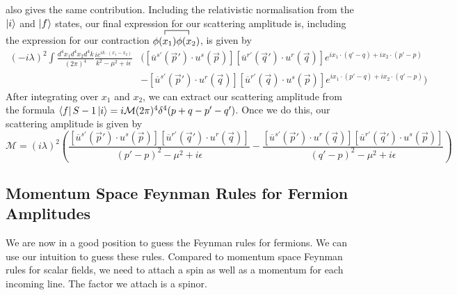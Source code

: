 also gives the same contribution. 
Including the relativistic normalisation 
from the $ \ket{ i } $ and $ \ket { f} $ states, 
our final expression for our scattering amplitude is, 
including the expression for our contraction $ \contraction{}{\phi ( x_1 ) }{}{\phi ( x_2) } \phi ( x_1 ) \phi ( x_2 ) $, 
is given by 
\begin{align*}
( - i \lambda ) ^ 2 \int \frac{ d ^ 4 x_1 d ^ 4 x_2 d ^ 4 k }{ ( 2 \pi )^{ 4 }  } \frac{i e ^{ ik \cdot  
\left(  x_1 - x_2  \right)  } }{ k ^ 2 - \mu ^ 2 + i \epsilon } & ( \left[  
\overline{ u } ^{ s ' } ( \vec{p} ' ) \cdot  u ^ s ( \vec{p} ) \right]  \left[  \overline{ u } ^{ r'  } \left( \vec{q}'   \right) \cdot  
u ^{ r } ( \vec{q} ) \right]  e ^{ i x_1 \cdot  ( q' - q ) + i x_2 \cdot  ( p' - p )  } \\
						& - \left[  \overline{ u } ^{ s' } \left( \vec{p}'  \right)  
						\cdot  u ^{ r } ( \vec{q} ) \right]  
						\left[  \overline{ u } ^{ r'} ( \vec{q} ) 
						\cdot  u ^ s ( \vec{p} ) \right]  
						e ^{ i x_1 \cdot  \left( p ' - q  \right)   + i x_2\cdot  
						\left( q' - p  \right)  } ) 
\end{align*} 
After integrating over $ x_1 $ and $ x_2 $, we can extract our 
scattering amplitude from the 
formula $ \bra{ f } S - 1 \ket{ i }  = i \mathcal{ M } ( 2 \pi )^{ 4 }  \delta ^ 4 ( p +  q - p ' - q' ) $. 
Once we do this, our scattering amplitude is given by 
\[
\mathcal{ M } = \left( i \lambda  \right) ^ 2 
\left( \frac{\left[  \overline{ u } ^{ s ' } ( \vec{p} ' ) \cdot  u ^{ s } ( \vec{p}  )  \right]  \left[ 
\overline{  u } ^{ r' } ( \vec{q} ' ) \cdot  u ^{ r } ( \vec{q} ) \right]  }{ \left( p ' - p  \right)  ^ 2 
- \mu ^ 2 +  i \epsilon }  - \frac{ \left[  \overline{ u } ^{ s ' } \left( \vec{p} '  \right) \cdot  u ^ r ( \vec{q} )  \right] \left[ 
\overline{ u } ^{ r' } ( \vec{q} ' ) \cdot  u^ s ( \vec{p} ) \right]   }{ ( q' - p ) ^ 2  - \mu ^ 2 + i \epsilon } \right) 
\] 

\subsection{Momentum Space Feynman Rules for Fermion Amplitudes} 
We are now in a good position to guess the 
Feynman rules for fermions. We can use our intuition to guess these rules.
Compared to momentum space Feynman rules for scalar fields, 
we need to attach a spin as well as a momentum 
for each incoming line. The factor we attach is a spinor. 

